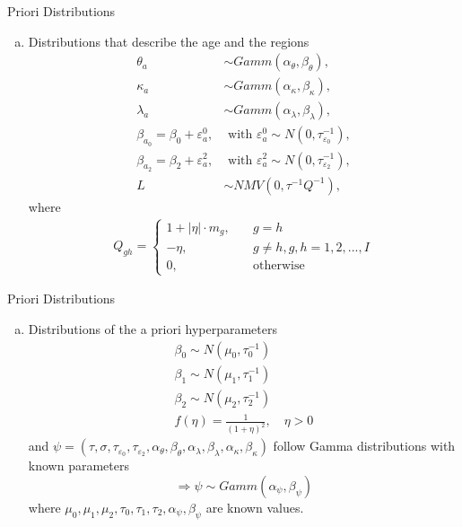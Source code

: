 \documentclass[10pt]{beamer} %
\begin{document}
\begin{frame}{Priori Distributions}
\begin{enumerate}[b)]
   \item Distributions that describe the age and the regions
	\begin{align*}
	\theta_{a}&\sim Gamm(\alpha_{\theta},\beta_{\theta}),\\
	\kappa_{a}&\sim Gamm(\alpha_{	\kappa},\beta_{	\kappa}),\\
	\lambda_{a}&\sim Gamm(\alpha_{\lambda},\beta_{\lambda}),\\
	\beta_{a_0}=\beta_0+\varepsilon_a^0,&\textrm{ with }\varepsilon_a^0\sim N(0,\tau_{\varepsilon_0}^{-1}),\\
	\beta_{a_2}=\beta_2+\varepsilon_a^2,& \textrm{ with }\varepsilon_a^2\sim N(0,\tau_{\varepsilon_2}^{-1}),\\
	L&\sim NMV(0,\tau^{-1}Q^{-1}),
	\end{align*}
	where 
	\begin{align*}
	Q_{gh}=\left\{\begin{matrix}
	1+|\eta|\cdot m_g, \quad &g=h\\
	-\eta, \quad &g\neq h,g,h=1,2,...,I\\
	0,\quad &\textrm{otherwise}
	\end{matrix}\right.
	\end{align*}
	    
\end{enumerate}
    
\end{frame}
\begin{frame}{Priori Distributions}
\begin{enumerate}[c)]
\item Distributions of the a priori hyperparameters
	\begin{align*}
	\beta_0\sim N(\mu_0,\tau_0^{-1})\\
	\beta_1\sim N(\mu_1,\tau_1^{-1})\\
	\beta_2\sim N(\mu_2,\tau_2^{-1})\\
	f(\eta)=\frac{1}{(1+\eta)^2},\quad \eta>0
	\end{align*}
	and $\psi=(\tau,\sigma,\tau_{\varepsilon_0},\tau_{\varepsilon_2},\alpha_{\theta},\beta_{\theta},\alpha_{\lambda},\beta_{\lambda},\alpha_{	\kappa},\beta_{	\kappa})$ follow Gamma distributions with known parameters $$\Rightarrow \psi \sim Gamm(\alpha_\psi,\beta_\psi)$$ where $\mu_0,\mu_1,\mu_2,\tau_0,\tau_1,\tau_2,\alpha_\psi,\beta_\psi$ are known values.
 \end{enumerate}   
\end{frame}
\end{document}
